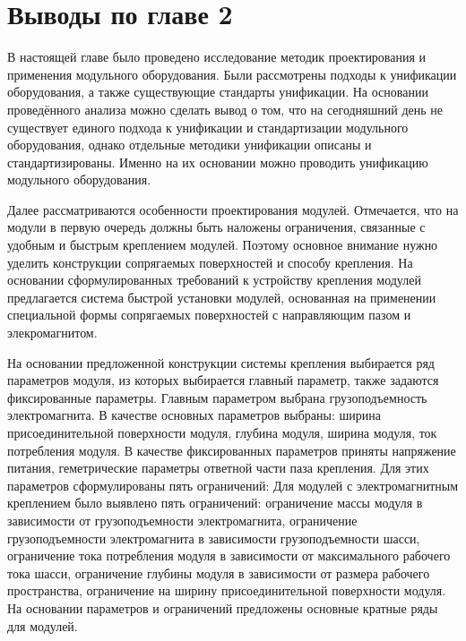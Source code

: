 %

\section{Выводы по главе 2}

В настоящей главе было проведено исследование методик проектирования и применения модульного оборудования. Были рассмотрены подходы к унификации оборудования, а также существующие стандарты унификации. На основании проведённого анализа можно сделать вывод о том, что на сегодняшний день не существует единого подхода к унификации и стандартизации модульного оборудования, однако отдельные методики унификации описаны и стандартизированы. Именно на их основании можно проводить унификацию модульного оборудования. 

Далее рассматриваются особенности проектирования модулей. Отмечается, что на модули в первую очередь должны быть наложены ограничения, связанные с удобным и быстрым креплением модулей. Поэтому основное внимание нужно уделить конструкции сопрягаемых поверхностей и способу крепления. На основании сформулированных требований к устройству крепления модулей предлагается система быстрой установки модулей, основанная на применении специальной формы сопрягаемых поверхностей с направляющим пазом и элекромагнитом.

На основании предложенной конструкции системы крепления выбирается ряд параметров модуля, из которых выбирается главный параметр, также задаются фиксированные параметры. Главным параметром выбрана грузоподъемность электромагнита. В качестве основных параметров выбраны: ширина присоединительной поверхности модуля, глубина модуля, ширина модуля, ток потребления модуля. В качестве фиксированных параметров приняты напряжение питания, геметрические параметры ответной части паза крепления. Для этих параметров сформулированы пять ограничений: Для модулей с электромагнитным креплением было выявлено пять ограничений: ограничение массы модуля в зависимости от грузоподъемности электромагнита, ограничение грузоподъемности электромагнита в зависимости грузоподъемности шасси, ограничение тока потребления модуля в зависимости от максимального рабочего тока шасси, ограничение глубины модуля в зависимости от размера рабочего пространства, ограничение на ширину присоединительной поверхности модуля. На основании параметров и ограничений предложены основные кратные ряды для модулей.

